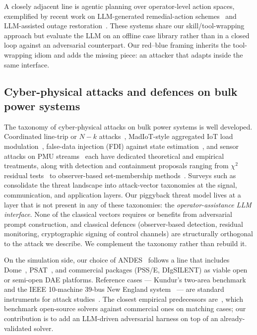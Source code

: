 \documentclass[journal,twocolumn,10pt]{IEEEtran}
\begin{document}
A closely adjacent line is agentic planning over operator-level action spaces, exemplified by recent work on LLM-generated remedial-action schemes~\cite{ras-llm} and LLM-assisted outage restoration~\cite{outage-llm}. These systems share our skill/tool-wrapping approach but evaluate the LLM on an offline case library rather than in a closed loop against an adversarial counterpart. Our red--blue framing inherits the tool-wrapping idiom and adds the missing piece: an attacker that adapts inside the same interface.

\subsection{Cyber-physical attacks and defences on bulk power systems}

The taxonomy of cyber-physical attacks on bulk power systems is well developed. Coordinated line-trip or $N{-}k$ attacks~\cite{n-k}, MadIoT-style aggregated IoT load modulation~\cite{madiot,madiot-extended}, false-data injection (FDI) against state estimation~\cite{liu11fdi,kosut11fdi,agc-fdi}, and sensor attacks on PMU streams~\cite{pmu-attack} each have dedicated theoretical and empirical treatments, along with detection and containment proposals ranging from $\chi^2$ residual tests~\cite{chi2-sensor} to observer-based set-membership methods~\cite{mo12cyberphysical}. Surveys such as~\cite{cps-survey} consolidate the threat landscape into attack-vector taxonomies at the signal, communication, and application layers. Our piggyback threat model lives at a layer that is not present in any of these taxonomies: the \emph{operator-assistance LLM interface}. None of the classical vectors requires or benefits from adversarial prompt construction, and classical defences (observer-based detection, residual monitoring, cryptographic signing of control channels) are structurally orthogonal to the attack we describe. We complement the taxonomy rather than rebuild it.

On the simulation side, our choice of ANDES~\cite{andes} follows a line that includes Dome~\cite{dome}, PSAT~\cite{psat}, and commercial packages (PSS/E, DIgSILENT) as viable open or semi-open DAE platforms. Reference cases --- Kundur's two-area benchmark~\cite{kundur} and the IEEE 10-machine 39-bus New England system~\cite{ieee39} --- are standard instruments for attack studies~\cite{ieee39-attacks,kundur-small-signal}. The closest empirical predecessors are~\cite{andes-comparison,psat-validation}, which benchmark open-source solvers against commercial ones on matching cases; our contribution is to add an LLM-driven adversarial harness on top of an already-validated solver.
\end{document}
